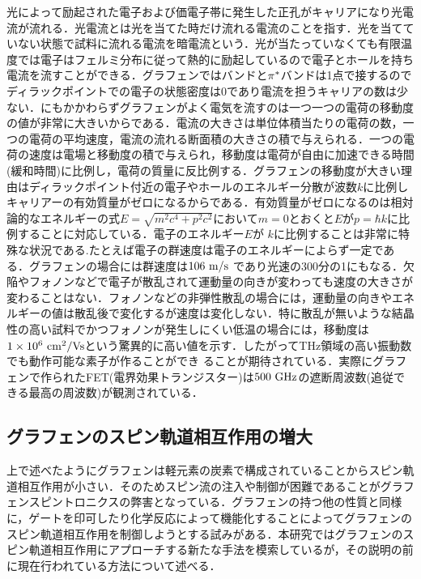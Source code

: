 光によって励起された電子および価電子帯に発生した正孔がキャリアになり光電流が流れる．光電流とは光を当てた時だけ流れる電流のことを指す．光を当てていない状態で試料に流れる電流を暗電流という．光が当たっていなくても有限温度では電子はフェルミ分布に従って熱的に励起しているので電子とホールを持ち電流を流すことができる．グラフェンでは\pi バンドと$\rm\pi^{*}$バンドは1点で接するのでディラックポイントでの電子の状態密度は0であり電流を担うキャリアの数は少ない．にもかかわらずグラフェンがよく電気を流すのは一つ一つの電荷の移動度の値が非常に大きいからである．電流の大きさは単位体積当たりの電荷の数，一つの電荷の平均速度，電流の流れる断面積の大きさの積で与えられる．一つの電荷の速度は電場と移動度の積で与えられ，移動度は電荷が自由に加速できる時間(緩和時間)に比例し，電荷の質量に反比例する．グラフェンの移動度が大きい理由はディラックポイント付近の電子やホールのエネルギー分散が波数$k$に比例しキャリアーの有効質量がゼロになるからである．有効質量がゼロになるのは相対論的なエネルギーの式$E = \sqrt{m^{2}c^{4} + p^{2}c^{2}}$において$m=0$とおくと$E$が$p=\hbar k$に比例することに対応している．電子のエネルギー$E$が $k$に比例することは非常に特殊な状況である.たとえば電子の群速度は電子のエネルギーによらず一定である．グラフェンの場合には群速度は$106\rm\ m/s$ であり光速の300分の1にもなる．欠陥やフォノンなどで電子が散乱されて運動量の向きが変わっても速度の大きさが変わることはない．フォノンなどの非弾性散乱の場合には，運動量の向きやエネルギーの値は散乱後で変化するが速度は変化しない．特に散乱が無いような結晶性の高い試料でかつフォノンが発生しにくい低温の場合には，移動度は$1\times10^{6}\rm\ cm^{2}/Vs$という驚異的に高い値を示す．したがってTHz領域の高い振動数でも動作可能な素子が作ることができ ることが期待されている．実際にグラフェンで作られたFET(電界効果トランジスター)は$500\rm\ GHz$の遮断周波数(追従できる最高の周波数)が観測されている．

\subsection{グラフェンのスピン軌道相互作用の増大}

上で述べたようにグラフェンは軽元素の炭素で構成されていることからスピン軌道相互作用が小さい．そのためスピン流の注入や制御が困難であることがグラフェンスピントロニクスの弊害となっている．グラフェンの持つ他の性質と同様に，ゲートを印可したり化学反応によって機能化することによってグラフェンのスピン軌道相互作用を制御しようとする試みがある．本研究ではグラフェンのスピン軌道相互作用にアプローチする新たな手法を模索しているが，その説明の前に現在行われている方法について述べる．

